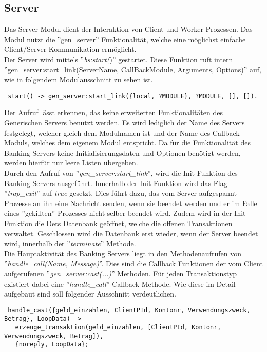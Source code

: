 \subsection{Server}
Das Server Modul dient der Interaktion von Client und Worker-Prozessen. Das Modul nutzt die ''gen\_server'' Funktionalität, welche eine möglichst einfache Client/Server Kommunikation ermöglicht.\\
Der Server wird mittels ''\textit{bs:start(})'' gestartet. Diese Funktion ruft intern ''gen\_server:start\_link(ServerName, CallBackModule, Arguments, Options)'' auf, wie in folgendem Modulausschnitt zu sehen ist.
\begin{lstlisting}
 start() -> gen_server:start_link({local, ?MODULE}, ?MODULE, [], []).
\end{lstlisting}
Der Aufruf lässt erkennen, das keine erweiterten Funktionalitäten des Generischen Servers benutzt werden. Es wird lediglich der Name des Servers festgelegt, welcher gleich dem Modulnamen ist und der Name des Callback Moduls, welches dem eigenem Modul entspricht. Da für die Funktionalität des Banking Servers keine Initialisierungsdaten und Optionen benötigt werden, werden hierfür nur leere Listen übergeben.\\
Durch den Aufruf von ''\textit{gen\_server:start\_link}'', wird die Init Funktion des Banking Servers ausgeführt.
Innerhalb der Init Funktion wird das Flag ''\textit{trap\_exit}'' auf \textit{true} gesetzt. Dies führt dazu, das vom Server aufgespannt Prozesse an ihn eine Nachricht senden, wenn sie beendet werden und er im Falle eines ''gekillten'' Prozesses nicht selber beendet wird. Zudem wird in der Init Funktion die Dets Datenbank geöffnet, welche die offenen Transaktionen verwaltet. Geschlossen wird die Datenbank erst wieder, wenn der Server beendet wird, innerhalb der ''\textit{terminate}'' Methode.\\
Die Hauptaktivität des Banking Servers liegt in den Methodenaufrufen von ''\textit{handle\_call(Name, Message)}''. Dies sind die Callback Funktionen der vom Client aufgerufenen ''\textit{gen\_server:cast(...)}'' Methoden. Für jeden Transaktionstyp existiert dabei eine ''\textit{handle\_call}'' Callback Methode. Wie diese im Detail aufgebaut sind soll folgender Ausschnitt verdeutlichen.
\begin{lstlisting}
 handle_cast({geld_einzahlen, ClientPId, Kontonr, Verwendungszweck, Betrag}, LoopData) ->
   erzeuge_transaktion(geld_einzahlen, [ClientPId, Kontonr, Verwendungszweck, Betrag]),
   {noreply, LoopData};
\end{lstlisting}

